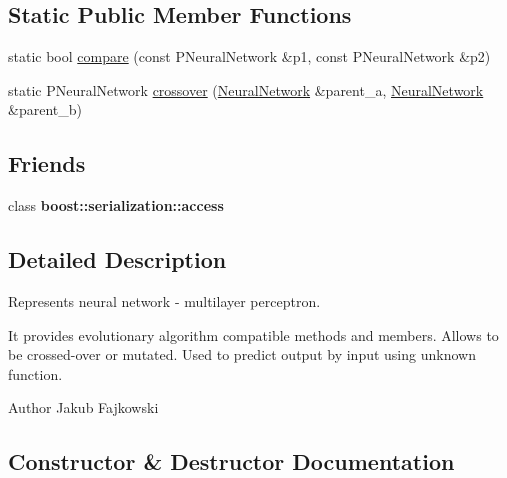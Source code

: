 \subsection*{Static Public Member Functions}
\begin{DoxyCompactItemize}
\item 
static bool \hyperlink{classNeuralNetwork_ac6e9655da50b97ca94f4e34bf3de3adc}{compare} (const P\+Neural\+Network \&p1, const P\+Neural\+Network \&p2)
\item 
static P\+Neural\+Network \hyperlink{classNeuralNetwork_a1168869bf81b753ae8b20ea518e11593}{crossover} (\hyperlink{classNeuralNetwork}{Neural\+Network} \&parent\+\_\+a, \hyperlink{classNeuralNetwork}{Neural\+Network} \&parent\+\_\+b)
\end{DoxyCompactItemize}
\subsection*{Friends}
\begin{DoxyCompactItemize}
\item 
class {\bfseries boost\+::serialization\+::access}\hypertarget{classNeuralNetwork_ac98d07dd8f7b70e16ccb9a01abf56b9c}{}\label{classNeuralNetwork_ac98d07dd8f7b70e16ccb9a01abf56b9c}

\end{DoxyCompactItemize}


\subsection{Detailed Description}
Represents neural network -\/ multilayer perceptron. 

It provides evolutionary algorithm compatible methods and members. Allows to be crossed-\/over or mutated. Used to predict output by input using unknown function. \begin{DoxyAuthor}{Author}
Jakub Fajkowski 
\end{DoxyAuthor}


\subsection{Constructor \& Destructor Documentation}
